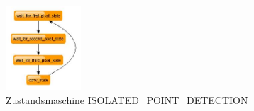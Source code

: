 \documentclass[ngerman,12pt]{article} %
\begin{document}
{\begin{figure}[htbp]
	\begin{center}
	\includegraphics[width = 0.25\textwidth]{ISOLATED_PONIT_DETECTION}
	\caption[Zustandsmaschine ISOLATED\_PONIT\_DETECTION]{\label{pic:Zustandsmaschine ISOLATED_POINT_DETECTION}Zustandsmaschine ISOLATED\_POINT\_DETECTION}
	\end{center}
\end{figure}

}
\end{document}
